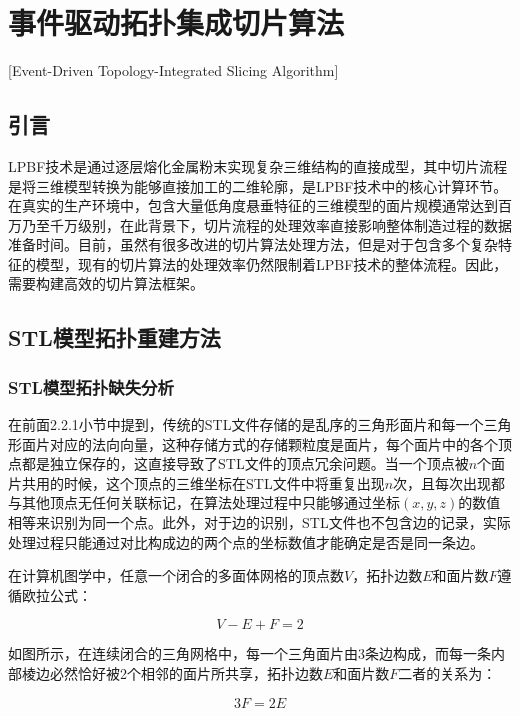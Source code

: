 
\chapter{事件驱动拓扑集成切片算法}[Event-Driven Topology-Integrated Slicing Algorithm]

\section{引言}

LPBF技术是通过逐层熔化金属粉末实现复杂三维结构的直接成型，其中切片流程是将三维模型转换为能够直接加工的二维轮廓，是LPBF技术中的核心计算环节。在真实的生产环境中，包含大量低角度悬垂特征的三维模型的面片规模通常达到百万乃至千万级别，在此背景下，切片流程的处理效率直接影响整体制造过程的数据准备时间。目前，虽然有很多改进的切片算法处理方法，但是对于包含多个复杂特征的模型，现有的切片算法的处理效率仍然限制着LPBF技术的整体流程。因此，需要构建高效的切片算法框架。

\section{STL模型拓扑重建方法}\label{sec:topo}

\subsection{STL模型拓扑缺失分析}

在前面2.2.1小节中提到，传统的STL文件存储的是乱序的三角形面片和每一个三角形面片对应的法向向量，这种存储方式的存储颗粒度是面片，每个面片中的各个顶点都是独立保存的，这直接导致了STL文件的顶点冗余问题。当一个顶点被$n$个面片共用的时候，这个顶点的三维坐标在STL文件中将重复出现$n$次，且每次出现都与其他顶点无任何关联标记，在算法处理过程中只能够通过坐标$\left( x,y,z \right)$的数值相等来识别为同一个点。此外，对于边的识别，STL文件也不包含边的记录，实际处理过程只能通过对比构成边的两个点的坐标数值才能确定是否是同一条边。

在计算机图学中，任意一个闭合的多面体网格的顶点数$V$，拓扑边数$E$和面片数$F$遵循欧拉公式：

\begin{equation}
V-E+F=2 \label{eq:euler}
\end{equation}

如图所示，在连续闭合的三角网格中，每一个三角面片由3条边构成，而每一条内部棱边必然恰好被2个相邻的面片所共享，拓扑边数$E$和面片数$F$二者的关系为：

\begin{equation}
3F=2E \label{eq:edge_face}
\end{equation}

